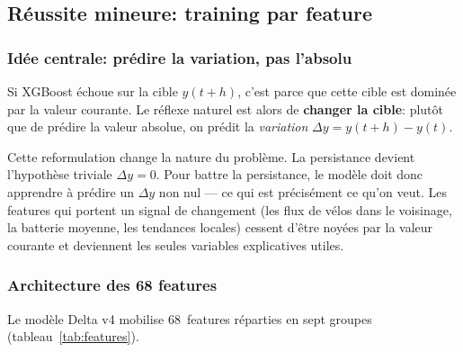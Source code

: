 \documentclass[fleqn, 12pt]{scrartcl}
\begin{document}
\subsection{Réussite mineure: training par feature}%
\label{ssec:feature}


\subsubsection*{Idée centrale: prédire la variation, pas l'absolu}

Si XGBoost échoue sur la cible $y(t+h)$, c'est parce que cette cible est dominée par la valeur courante. Le réflexe naturel est alors de \textbf{changer la cible}: plutôt que de prédire la valeur absolue, on prédit la \emph{variation} $\Delta y = y(t+h) - y(t)$.

\vspace{0.3cm}

Cette reformulation change la nature du problème. La persistance devient l'hypothèse triviale $\Delta y = 0$. Pour battre la persistance, le modèle doit donc apprendre à prédire un $\Delta y$ non nul --- ce qui est précisément ce qu'on veut. Les features qui portent un signal de changement (les flux de vélos dans le voisinage, la batterie moyenne, les tendances locales) cessent d'être noyées par la valeur courante et deviennent les seules variables explicatives utiles.

\subsubsection*{Architecture des 68 features}

Le modèle Delta v4 mobilise 68~features réparties en sept groupes (tableau~\ref{tab:features}).
\end{document}
